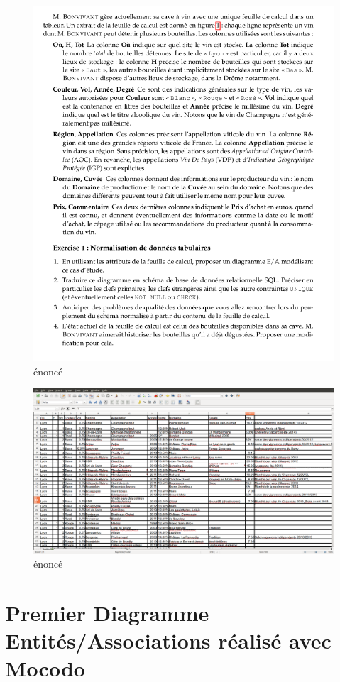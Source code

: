 \documentclass[11pt]{article}
\makeatletter
\def\maxwidth{\ifdim\Gin@nat@width>\linewidth\linewidth
    \else\Gin@nat@width\fi}
\let\Oldincludegraphics\includegraphics
\renewcommand{\includegraphics}[1]{\Oldincludegraphics[width=.8\maxwidth]{#1}}
\makeatother
\begin{document}
\begin{figure}
\centering
\includegraphics{images/tp_modelisation.png}
\caption{énoncé}
\end{figure}

\begin{figure}
\centering
\includegraphics{images/tp_modelisation2.png}
\caption{énoncé}
\end{figure}

    \hypertarget{premier-diagramme-entituxe9sassociations-ruxe9alisuxe9-avec-mocodo}{%
\section{Premier Diagramme Entités/Associations réalisé avec
Mocodo}\label{premier-diagramme-entituxe9sassociations-ruxe9alisuxe9-avec-mocodo}}
\end{document}
